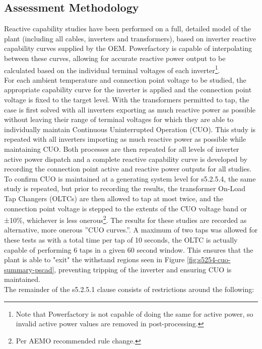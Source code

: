 \documentclass{../grid-link-report}
\begin{document}
	\subsection{Assessment Methodology}
	Reactive capability studies have been performed on a full, detailed model of the plant (including 
	all cables, inverters and transformers), based on inverter reactive capability curves supplied by 
	the OEM. Powerfactory is capable of interpolating between these curves, allowing for accurate 
	reactive power output to be calculated based on the individual terminal voltages of each inverter\footnote{Note that Powerfactory is not capable of doing the same for active power, so invalid active power values are
		removed in post-processing.}.\\
	For each ambient temperature and connection point voltage to be studied, the appropriate capability curve for the inverter is applied and the connection point voltage is fixed to the target level. With the transformers permitted to tap, the case is first solved with all inverters exporting as much reactive power as possible without leaving their range of terminal voltages for which they are able to individually maintain Continuous Uninterrupted Operation (CUO). This study is repeated with all inverters importing as much reactive power as possible while maintaining CUO. Both processes are then repeated for all levels of inverter active power dispatch and a complete reactive capability curve is developed by recording the connection point active and reactive power outputs for all studies.\\
	To confirm CUO is maintained at a generating system level for s5.2.5.4, the same study is repeated, but prior to recording the results, the transformer On-Load Tap Changers (OLTCs) are then allowed to tap at most twice, and the connection point voltage is stepped to the extents of the CUO voltage band or ±10\%, 
	whichever is less onerous\footnote{Per AEMO recommended rule change.}. The results for these studies are recorded as alternative, more onerous ”CUO curves.”. A maximum of two taps was allowed for these tests as with a total time per tap of 10 seconds, the OLTC is actually capable of performing 6 taps in a given 60 second window. This ensures that the plant is able to "exit" the withstand regions seen in Figure \ref{fig:s5254-cuo-summary-pscad}, preventing tripping of the inverter and ensuring CUO is maintained. \\
	The remainder of the s5.2.5.1 clause consists of restrictions around the following:
\end{document}
